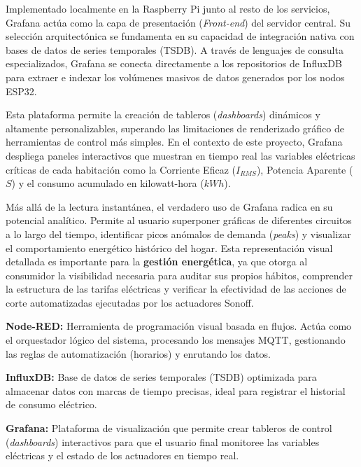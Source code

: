 
            Implementado localmente en la Raspberry Pi junto al resto de los servicios, Grafana actúa como la capa de presentación (\textit{Front-end}) del servidor central. Su selección arquitectónica se fundamenta en su capacidad de integración nativa con bases de datos de series temporales (TSDB). A través de lenguajes de consulta especializados, Grafana se conecta directamente a los repositorios de InfluxDB para extraer e indexar los volúmenes masivos de datos generados por los nodos ESP32.

            Esta plataforma permite la creación de tableros (\textit{dashboards}) dinámicos y altamente personalizables, superando las limitaciones de renderizado gráfico de herramientas de control más simples. En el contexto de este proyecto, Grafana despliega paneles interactivos que muestran en tiempo real las variables eléctricas críticas de cada habitación como la Corriente Eficaz ($I_{RMS}$), Potencia Aparente ($S$) y el consumo acumulado en kilowatt-hora ($kWh$).

            Más allá de la lectura instantánea, el verdadero uso de Grafana radica en su potencial analítico. Permite al usuario superponer gráficas de diferentes circuitos a lo largo del tiempo, identificar picos anómalos de demanda (\textit{peaks}) y visualizar el comportamiento energético histórico del hogar. Esta representación visual detallada es importante para la \textbf{gestión energética}, ya que otorga al consumidor la visibilidad necesaria para auditar sus propios hábitos, comprender la estructura de las tarifas eléctricas y verificar la efectividad de las acciones de corte automatizadas ejecutadas por los actuadores Sonoff.    


        \textbf{Node-RED:} Herramienta de programación visual basada en flujos. Actúa como el orquestador lógico del sistema, procesando los mensajes MQTT, gestionando las reglas de automatización (horarios) y enrutando los datos.
        
        \textbf{InfluxDB:} Base de datos de series temporales (TSDB) optimizada para almacenar datos con marcas de tiempo precisas, ideal para registrar el historial de consumo eléctrico.
        
        \textbf{Grafana:} Plataforma de visualización que permite crear tableros de control (\textit{dashboards}) interactivos para que el usuario final monitoree las variables eléctricas y el estado de los actuadores en tiempo real.
\newpage

